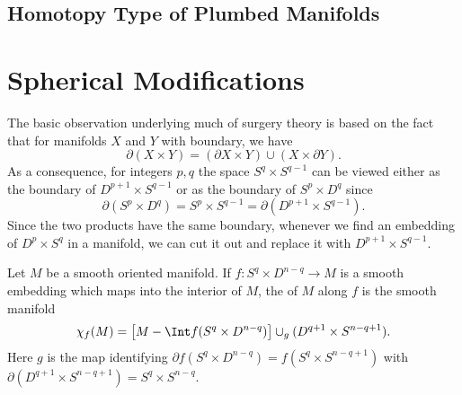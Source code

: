 %
%
%
%
%

\subsection{Homotopy Type of Plumbed Manifolds}



\section{Spherical Modifications}

The basic observation underlying much of surgery theory is based on the fact that for manifolds $X$ and $Y$ with boundary, we have
\[
	\partial (X\times Y) = (\partial X \times Y)\cup (X\times \partial Y).
\]
As a consequence, for integers $p,q$ the space $S^q\times S^{q-1}$ can be viewed either as the boundary of $D^{p+1}\times S^{q-1}$ or as the boundary of $S^p\times D^q$ since
\[
	\partial (S^p\times D^q) = S^p\times S^{q-1} = \partial (D^{p+1}\times S^{q-1}).
\]
Since the two products have the same boundary, whenever we find an embedding of $D^{p}\times S^{q}$ in a manifold, we can cut it out and replace it with $D^{p+1}\times S^{q-1}$.

\begin{definition}\label{def:surgery}
	Let $M$ be a smooth oriented manifold. If $f : S^q\times D^{n-q} \to M$ is a smooth embedding which maps into the interior of $M$, the  of $M$ along $f$ is the smooth manifold
	\begin{equation}\label{eq:surgery-definition}
		\chi_f(M) = \left[M-\Int f(S^q\times D^{n-q})\right]\cup_{g} (D^{q+1}\times S^{n-q+1}).
	\end{equation}
	Here $g$ is the map identifying $\partial f(S^q\times D^{n-q})=f(S^q\times S^{n-q+1})$ with $\partial (D^{q+1}\times S^{n-q+1})=S^q\times S^{n-q}$.
\end{definition}

